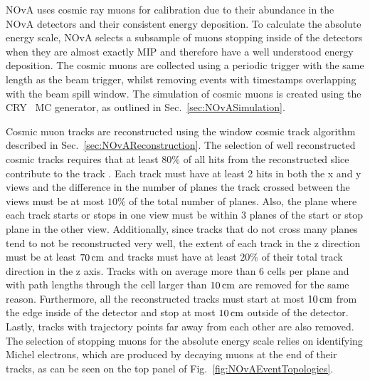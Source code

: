 
\gls{NOvA} uses cosmic ray muons for calibration due to their abundance in the \gls{NOvA} detectors and their consistent energy deposition. To calculate the absolute energy scale, \gls{NOvA} selects a subsample of muons stopping inside of the detectors when they are almost exactly \gls{MIP} and therefore have a well understood energy deposition. The cosmic muons are collected using a periodic trigger with the same length as the beam trigger, whilst removing events with timestamps overlapping with the beam spill window. The simulation of cosmic muons is created using the \gls{CRY}~\cite{CRY} \gls{MC} generator, as outlined in Sec.~\ref{sec:NOvASimulation}.


Cosmic muon tracks are reconstructed using the window cosmic track algorithm described in Sec.~\ref{sec:NOvAReconstruction}. The selection of well reconstructed cosmic tracks requires that at least $80\%$ of all hits from the reconstructed slice contribute to the track \cite{NOvA-doc-13579-FACalorimetricEnergyScale}. Each track must have at least 2 hits in both the x and y views and the difference in the number of planes the track crossed between the views must be at most $10\%$ of the total number of planes. Also, the plane where each track starts or stops in one view must be within 3 planes of the start or stop plane in the other view. Additionally, since tracks that do not cross many planes tend to not be reconstructed very well, the extent of each track in the z direction must be at least $\unit[70]{cm}$ and tracks must have at least $20\%$ of their total track direction in the z axis. Tracks with on average more than 6 cells per plane and with path lengths through the cell larger than $\unit[10]{cm}$ are removed for the same reason. Furthermore, all the reconstructed tracks must start at most $\unit[10]{cm}$ from the edge inside of the detector and stop at most $\unit[10]{cm}$ outside of the detector. Lastly, tracks with trajectory points far away from each other are also removed. The selection of stopping muons for the absolute energy scale relies on identifying Michel electrons, which are produced by decaying muons at the end of their tracks, as can be seen on the top panel of Fig.~\ref{fig:NOvAEventTopologies}.

